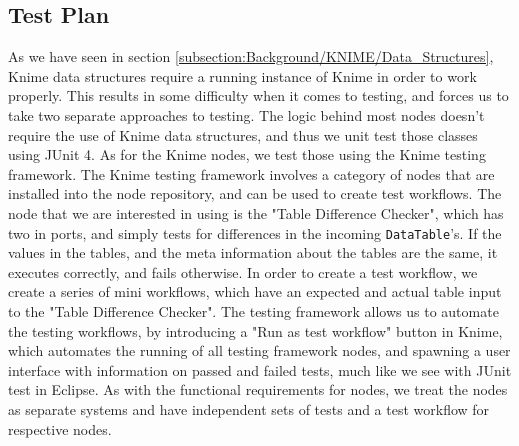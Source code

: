 \documentclass[11pt,openany]{book}
\begin{document}
\subsection{Test Plan}
As we have seen in section \ref{subsection:Background/KNIME/Data_Structures}, Knime data structures require a running instance of Knime in order to work properly. This results in some difficulty when it comes to testing, and forces us to take two separate approaches to testing. The logic behind most nodes doesn't require the use of Knime data structures, and thus we unit test those classes using JUnit 4. As for the Knime nodes, we test those using the Knime testing framework. The Knime testing framework involves a category of nodes that are installed into the node repository, and can be used to create test workflows. The node that we are interested in using is the "Table Difference Checker", which has two in ports, and simply tests for differences in the incoming \texttt{DataTable}'s. If the values in the tables, and the meta information about the tables are the same, it executes correctly, and fails otherwise. In order to create a test workflow, we create a series of mini workflows, which have an expected and actual table input to the "Table Difference Checker". The testing framework allows us to automate the testing workflows, by introducing a "Run as test workflow" button in Knime, which automates the running of all testing framework nodes, and spawning a user interface with information on passed and failed tests, much like we see with JUnit test in Eclipse. As with the functional requirements for nodes, we treat the nodes as separate systems and have independent sets of tests and a test workflow for respective nodes. 
\end{document}
